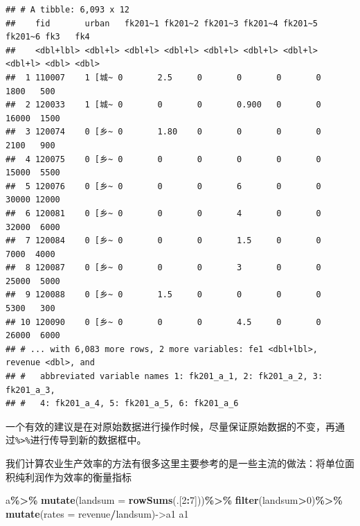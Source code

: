 \documentclass[
  oneside]{book}
\newenvironment{Shaded}{\begin{snugshade}}{\end{snugshade}}
\newcommand{\AttributeTok}[1]{\textcolor[rgb]{0.13,0.29,0.53}{#1}}
\newcommand{\DecValTok}[1]{\textcolor[rgb]{0.00,0.00,0.81}{#1}}
\newcommand{\FunctionTok}[1]{\textcolor[rgb]{0.13,0.29,0.53}{\textbf{#1}}}
\newcommand{\NormalTok}[1]{#1}
\newcommand{\OtherTok}[1]{\textcolor[rgb]{0.56,0.35,0.01}{#1}}
\newcommand{\SpecialCharTok}[1]{\textcolor[rgb]{0.81,0.36,0.00}{\textbf{#1}}}
\begin{document}
\begin{verbatim}
## # A tibble: 6,093 x 12
##    fid       urban   fk201~1 fk201~2 fk201~3 fk201~4 fk201~5 fk201~6 fk3   fk4  
##    <dbl+lbl> <dbl+l> <dbl+l> <dbl+l> <dbl+l> <dbl+l> <dbl+l> <dbl+l> <dbl> <dbl>
##  1 110007    1 [城~ 0       2.5     0       0       0       0        1800   500
##  2 120033    1 [城~ 0       0       0       0.900   0       0       16000  1500
##  3 120074    0 [乡~ 0       1.80    0       0       0       0        2100   900
##  4 120075    0 [乡~ 0       0       0       0       0       0       15000  5500
##  5 120076    0 [乡~ 0       0       0       6       0       0       30000 12000
##  6 120081    0 [乡~ 0       0       0       4       0       0       32000  6000
##  7 120084    0 [乡~ 0       0       0       1.5     0       0        7000  4000
##  8 120087    0 [乡~ 0       0       0       3       0       0       25000  5000
##  9 120088    0 [乡~ 0       1.5     0       0       0       0        5300   300
## 10 120090    0 [乡~ 0       0       0       4.5     0       0       26000  6000
## # ... with 6,083 more rows, 2 more variables: fe1 <dbl+lbl>, revenue <dbl>, and
## #   abbreviated variable names 1: fk201_a_1, 2: fk201_a_2, 3: fk201_a_3,
## #   4: fk201_a_4, 5: fk201_a_5, 6: fk201_a_6
\end{verbatim}

一个有效的建议是在对原始数据进行操作时候，尽量保证原始数据的不变，再通过\texttt{\%\textgreater{}\%}进行传导到新的数据框中。

我们计算农业生产效率的方法有很多这里主要参考的是一些主流的做法：将单位面积纯利润作为效率的衡量指标

\begin{Shaded}
\begin{Highlighting}[]
\NormalTok{a}\SpecialCharTok{\%\textgreater{}\%}
  \FunctionTok{mutate}\NormalTok{(}\AttributeTok{landsum =} \FunctionTok{rowSums}\NormalTok{(.[}\DecValTok{2}\SpecialCharTok{:}\DecValTok{7}\NormalTok{]))}\SpecialCharTok{\%\textgreater{}\%}
  \FunctionTok{filter}\NormalTok{(landsum}\SpecialCharTok{\textgreater{}}\DecValTok{0}\NormalTok{)}\SpecialCharTok{\%\textgreater{}\%}
  \FunctionTok{mutate}\NormalTok{(}\AttributeTok{rates =}\NormalTok{ revenue}\SpecialCharTok{/}\NormalTok{landsum)}\OtherTok{{-}\textgreater{}}\NormalTok{a1}
\NormalTok{a1}
\end{Highlighting}
\end{Shaded}
\end{document}
